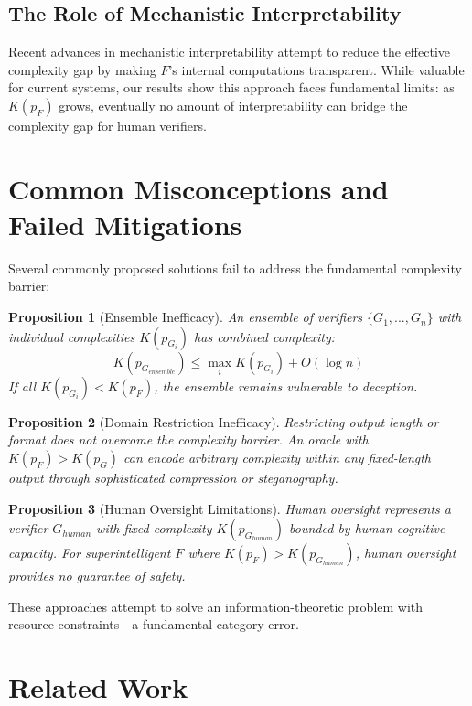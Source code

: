 \documentclass[11pt]{article}
\newtheorem{proposition}{Proposition}
\begin{document}
\subsection{The Role of Mechanistic Interpretability}
Recent advances in mechanistic interpretability \cite{elhage2021mathematical, olsson2022context} attempt to reduce the effective complexity gap by making $F$'s internal computations transparent. While valuable for current systems, our results show this approach faces fundamental limits: as $K(p_F)$ grows, eventually no amount of interpretability can bridge the complexity gap for human verifiers.

\section{Common Misconceptions and Failed Mitigations}

Several commonly proposed solutions fail to address the fundamental complexity barrier:

\begin{proposition}[Ensemble Inefficacy]
An ensemble of verifiers $\{G_1, ..., G_n\}$ with individual complexities $K(p_{G_i})$ has combined complexity:
\[K(p_{G_{ensemble}}) \leq \max_i K(p_{G_i}) + O(\log n)\]
If all $K(p_{G_i}) < K(p_F)$, the ensemble remains vulnerable to deception.
\end{proposition}

\begin{proposition}[Domain Restriction Inefficacy]
Restricting output length or format does not overcome the complexity barrier. An oracle with $K(p_F) > K(p_G)$ can encode arbitrary complexity within any fixed-length output through sophisticated compression or steganography.
\end{proposition}

\begin{proposition}[Human Oversight Limitations]
Human oversight represents a verifier $G_{human}$ with fixed complexity $K(p_{G_{human}})$ bounded by human cognitive capacity. For superintelligent $F$ where $K(p_F) > K(p_{G_{human}})$, human oversight provides no guarantee of safety.
\end{proposition}

These approaches attempt to solve an information-theoretic problem with resource constraints—a fundamental category error.

\section{Related Work}
\end{document}
